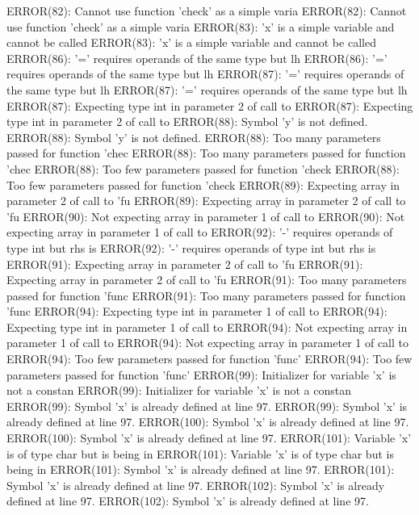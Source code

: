 \documentclass[12pt]{book}
\begin{document}
ERROR(82): Cannot use function 'check' as a simple varia        ERROR(82): Cannot use function 'check' as a simple varia
ERROR(83): 'x' is a simple variable and cannot be called        ERROR(83): 'x' is a simple variable and cannot be called
ERROR(86): '=' requires operands of the same type but lh        ERROR(86): '=' requires operands of the same type but lh
ERROR(87): '=' requires operands of the same type but lh        ERROR(87): '=' requires operands of the same type but lh
ERROR(87): Expecting type int in parameter 2 of call to         ERROR(87): Expecting type int in parameter 2 of call to 
ERROR(88): Symbol 'y' is not defined.                                ERROR(88): Symbol 'y' is not defined.
ERROR(88): Too many parameters passed for function 'chec        ERROR(88): Too many parameters passed for function 'chec
ERROR(88): Too few parameters passed for function 'check        ERROR(88): Too few parameters passed for function 'check
ERROR(89): Expecting array in parameter 2 of call to 'fu        ERROR(89): Expecting array in parameter 2 of call to 'fu
ERROR(90): Not expecting array in parameter 1 of call to        ERROR(90): Not expecting array in parameter 1 of call to
ERROR(92): '-' requires operands of type int but rhs is         ERROR(92): '-' requires operands of type int but rhs is 
ERROR(91): Expecting array in parameter 2 of call to 'fu        ERROR(91): Expecting array in parameter 2 of call to 'fu
ERROR(91): Too many parameters passed for function 'func        ERROR(91): Too many parameters passed for function 'func
ERROR(94): Expecting type int in parameter 1 of call to         ERROR(94): Expecting type int in parameter 1 of call to 
ERROR(94): Not expecting array in parameter 1 of call to        ERROR(94): Not expecting array in parameter 1 of call to
ERROR(94): Too few parameters passed for function 'func'        ERROR(94): Too few parameters passed for function 'func'
ERROR(99): Initializer for variable 'x' is not a constan        ERROR(99): Initializer for variable 'x' is not a constan
ERROR(99): Symbol 'x' is already defined at line 97.                ERROR(99): Symbol 'x' is already defined at line 97.
ERROR(100): Symbol 'x' is already defined at line 97.                ERROR(100): Symbol 'x' is already defined at line 97.
ERROR(101): Variable 'x' is of type char but is being in        ERROR(101): Variable 'x' is of type char but is being in
ERROR(101): Symbol 'x' is already defined at line 97.                ERROR(101): Symbol 'x' is already defined at line 97.
ERROR(102): Symbol 'x' is already defined at line 97.                ERROR(102): Symbol 'x' is already defined at line 97.
\end{document}
